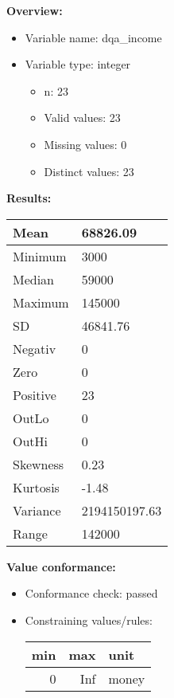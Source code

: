\documentclass[
]{article}
\providecommand{\tightlist}{%
  \setlength{\itemsep}{0pt}\setlength{\parskip}{0pt}}
\begin{document}
\textbf{Overview:}

\begin{itemize}
\tightlist
\item
  Variable name: dqa\_income
\item
  Variable type: integer

  \begin{itemize}
  \tightlist
  \item
    n: 23
  \item
    Valid values: 23
  \item
    Missing values: 0
  \item
    Distinct values: 23
  \end{itemize}
\end{itemize}

\textbf{Results:}\\

\begin{table}[H]
\centering
\begin{tabular}{l|l}
\hline
Mean & 68826.09\\
\hline
Minimum & 3000\\
\hline
Median & 59000\\
\hline
Maximum & 145000\\
\hline
SD & 46841.76\\
\hline
Negativ & 0\\
\hline
Zero & 0\\
\hline
Positive & 23\\
\hline
OutLo & 0\\
\hline
OutHi & 0\\
\hline
Skewness & 0.23\\
\hline
Kurtosis & -1.48\\
\hline
Variance & 2194150197.63\\
\hline
Range & 142000\\
\hline
\end{tabular}
\end{table}

\textbf{Value conformance:}

\begin{itemize}
\tightlist
\item
  Conformance check: passed
\item
  Constraining values/rules:

  \begin{table}[H]
  \centering
  \begin{tabular}{r|r|l}
  \hline
  \textbf{min} & \textbf{max} & \textbf{unit}\\
  \hline
  0 & Inf & money\\
  \hline
  \end{tabular}
  \end{table}
\end{itemize}
\end{document}
